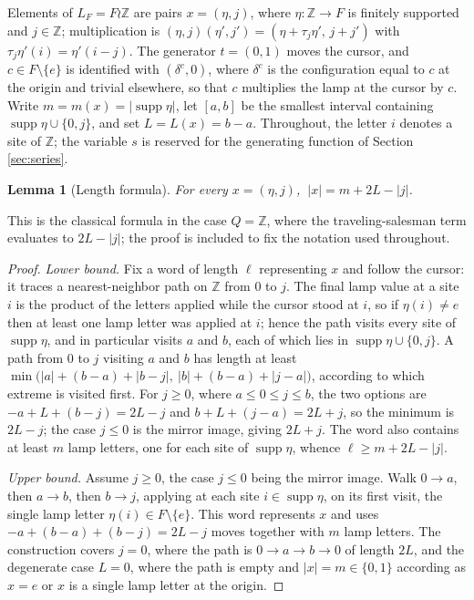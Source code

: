 \documentclass[11pt]{amsart}
\newtheorem{lemma}[theorem]{Lemma}
\theoremstyle{definition}
\theoremstyle{remark}
\newcommand{\Z}{\mathbb{Z}}
\newcommand{\supp}{\operatorname{supp}}
\begin{document}
Elements of $L_F=F\wr\Z$ are pairs $x=(\eta,j)$, where $\eta\colon\Z\to F$ is finitely supported and $j\in\Z$; multiplication is $(\eta,j)(\eta',j')=(\eta+\tau_j\eta',\,j+j')$ with $\tau_j\eta'(i)=\eta'(i-j)$. The generator $t=(0,1)$ moves the cursor, and $c\in F\setminus\{e\}$ is identified with $(\delta^{c},0)$, where $\delta^{c}$ is the configuration equal to $c$ at the origin and trivial elsewhere, so that $c$ multiplies the lamp at the cursor by $c$. Write $m=m(x)=|\supp\eta|$, let $[a,b]$ be the smallest interval containing $\supp\eta\cup\{0,j\}$, and set $L=L(x)=b-a$. Throughout, the letter $i$ denotes a site of $\Z$; the variable $s$ is reserved for the generating function of Section \ref{sec:series}.

\begin{lemma}[Length formula]\label{lem:length}
For every $x=(\eta,j)$, $\ |x|=m+2L-|j|$.
\end{lemma}

This is the classical formula in the case $Q=\Z$, where the traveling-salesman term evaluates to $2L-|j|$; the proof is included to fix the notation used throughout.

\begin{proof}
\emph{Lower bound.} Fix a word of length $\ell$ representing $x$ and follow the cursor: it traces a nearest-neighbor path on $\Z$ from $0$ to $j$. The final lamp value at a site $i$ is the product of the letters applied while the cursor stood at $i$, so if $\eta(i)\neq e$ then at least one lamp letter was applied at $i$; hence the path visits every site of $\supp\eta$, and in particular visits $a$ and $b$, each of which lies in $\supp\eta\cup\{0,j\}$. A path from $0$ to $j$ visiting $a$ and $b$ has length at least
$\min\big(|a|+(b-a)+|b-j|,\ |b|+(b-a)+|j-a|\big)$,
according to which extreme is visited first. For $j\ge0$, where $a\le0\le j\le b$, the two options are $-a+L+(b-j)=2L-j$ and $b+L+(j-a)=2L+j$, so the minimum is $2L-j$; the case $j\le0$ is the mirror image, giving $2L+j$. The word also contains at least $m$ lamp letters, one for each site of $\supp\eta$, whence $\ell\ge m+2L-|j|$.

\emph{Upper bound.} Assume $j\ge0$, the case $j\le0$ being the mirror image. Walk $0\to a$, then $a\to b$, then $b\to j$, applying at each site $i\in\supp\eta$, on its first visit, the single lamp letter $\eta(i)\in F\setminus\{e\}$. This word represents $x$ and uses $-a+(b-a)+(b-j)=2L-j$ moves together with $m$ lamp letters. The construction covers $j=0$, where the path is $0\to a\to b\to0$ of length $2L$, and the degenerate case $L=0$, where the path is empty and $|x|=m\in\{0,1\}$ according as $x=e$ or $x$ is a single lamp letter at the origin.
\end{proof}
\end{document}
